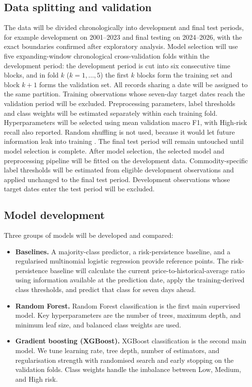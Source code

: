 \documentclass[12pt,a4paper]{article}
\begin{document}
\subsection{Data splitting and validation}
The data will be divided chronologically into development and final test periods, for example development on 2001--2023 and final testing on 2024--2026, with the exact boundaries confirmed after exploratory analysis. Model selection will use five expanding-window chronological cross-validation folds within the development period: the development period is cut into six consecutive time blocks, and in fold $k$ ($k = 1, \ldots, 5$) the first $k$ blocks form the training set and block $k+1$ forms the validation set. All records sharing a date will be assigned to the same partition. Training observations whose seven-day target dates reach the validation period will be excluded. Preprocessing parameters, label thresholds and class weights will be estimated separately within each training fold. Hyperparameters will be selected using mean validation macro F1, with High-risk recall also reported. Random shuffling is not used, because it would let future information leak into training \cite{bergmeir2012use, cerqueira2020evaluating}. The final test period will remain untouched until model selection is complete. After model selection, the selected model and preprocessing pipeline will be fitted on the development data. Commodity-specific label thresholds will be estimated from eligible development observations and applied unchanged to the final test period. Development observations whose target dates enter the test period will be excluded.

\subsection{Model development}
Three groups of models will be developed and compared:
\begin{itemize}
    \item \textbf{Baselines.} A majority-class predictor, a risk-persistence baseline, and a regularised multinomial logistic regression provide reference points. The risk-persistence baseline will calculate the current price-to-historical-average ratio using information available at the prediction date, apply the training-derived class thresholds, and predict that class for seven days ahead.
    \item \textbf{Random Forest.} Random Forest classification \cite{breiman2001random} is the first main supervised model. Key hyperparameters are the number of trees, maximum depth, and minimum leaf size, and balanced class weights are used.
    \item \textbf{Gradient boosting (XGBoost).} XGBoost classification \cite{chen2016xgboost} is the second main model. We tune learning rate, tree depth, number of estimators, and regularisation strength with randomised search and early stopping on the validation folds. Class weights handle the imbalance between Low, Medium, and High risk.
\end{itemize}
\end{document}
